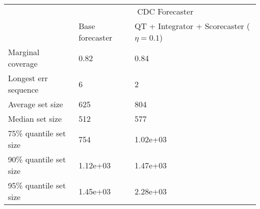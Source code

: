 \begin{tabular}{lll}
\toprule
& \multicolumn{2}{c}{CDC Forecaster} \\
& Base forecaster & QT + Integrator + Scorecaster ($\eta=0.1$) \\
\midrule
Marginal coverage & 0.82 & 0.84 \\
Longest err sequence & 6 & 2 \\
Average set size & 625 & 804 \\
Median set size & 512 & 577 \\
75\% quantile set size & 754 & 1.02e+03 \\
90\% quantile set size & 1.12e+03 & 1.47e+03 \\
95\% quantile set size & 1.45e+03 & 2.28e+03 \\
\bottomrule
\end{tabular}
